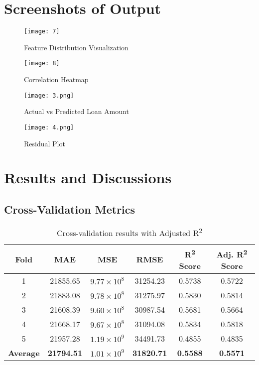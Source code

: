 \documentclass[11pt]{article}
\begin{document}
\section*{Screenshots of Output}
\begin{figure}[H]
    \centering
    \texttt{[image: 7]}
    \caption{Feature Distribution Visualization}
\end{figure}

\begin{figure}[H]
    \centering
    \texttt{[image: 8]}
    \caption{Correlation Heatmap}
\end{figure}

\begin{figure}[H]
    \centering
    \texttt{[image: 3.png]}
    \caption{Actual vs Predicted Loan Amount}
\end{figure}

\begin{figure}[H]
    \centering
    \texttt{[image: 4.png]}
    \caption{Residual Plot}
\end{figure}

\section*{Results and Discussions}

\subsection*{Cross-Validation Metrics}
\begin{table}[h!]
\centering
\begin{tabular}{|c|c|c|c|c|c|}
\hline
Fold & MAE & MSE & RMSE & R\textsuperscript{2} Score & Adj. R\textsuperscript{2} Score \\ \hline
1 & 21855.65 & $9.77 \times 10^8$ & 31254.23 & 0.5738 & 0.5722 \\
2 & 21883.08 & $9.78 \times 10^8$ & 31275.97 & 0.5830 & 0.5814 \\
3 & 21608.39 & $9.60 \times 10^8$ & 30987.54 & 0.5681 & 0.5664 \\
4 & 21668.17 & $9.67 \times 10^8$ & 31094.08 & 0.5834 & 0.5818 \\
5 & 21957.28 & $1.19 \times 10^9$ & 34491.73 & 0.4855 & 0.4835 \\ \hline
\textbf{Average} & \textbf{21794.51} & \textbf{$1.01 \times 10^9$} & \textbf{31820.71} & \textbf{0.5588} & \textbf{0.5571} \\ \hline
\end{tabular}
\caption{Cross-validation results with Adjusted R\textsuperscript{2}}
\end{table}
\end{document}
